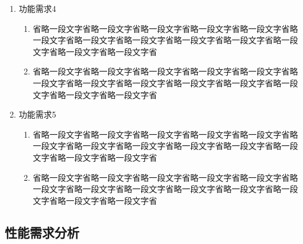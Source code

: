 \begin{enumerate}[fullwidth,itemindent=2em,listparindent=2em]
    \item 功能需求4
    
    	\begin{enumerate}
    		\item 省略一段文字省略一段文字省略一段文字省略一段文字省略一段文字省略一段文字省略一段文字省略一段文字省略一段文字省略一段文字省略一段文字省略一段文字省略一段文字省

    		\item 省略一段文字省略一段文字省略一段文字省略一段文字省略一段文字省略一段文字省略一段文字省略一段文字省略一段文字省略一段文字省略一段文字省略一段文字省略一段文字省
    	\end{enumerate}
    	

    \item 功能需求5
    
    	\begin{enumerate}
    		\item 省略一段文字省略一段文字省略一段文字省略一段文字省略一段文字省略一段文字省略一段文字省略一段文字省略一段文字省略一段文字省略一段文字省略一段文字省略一段文字省

    		\item 省略一段文字省略一段文字省略一段文字省略一段文字省略一段文字省略一段文字省略一段文字省略一段文字省略一段文字省略一段文字省略一段文字省略一段文字省略一段文字省
    	\end{enumerate}

	\end{enumerate}
    
    
	\subsection{性能需求分析}

